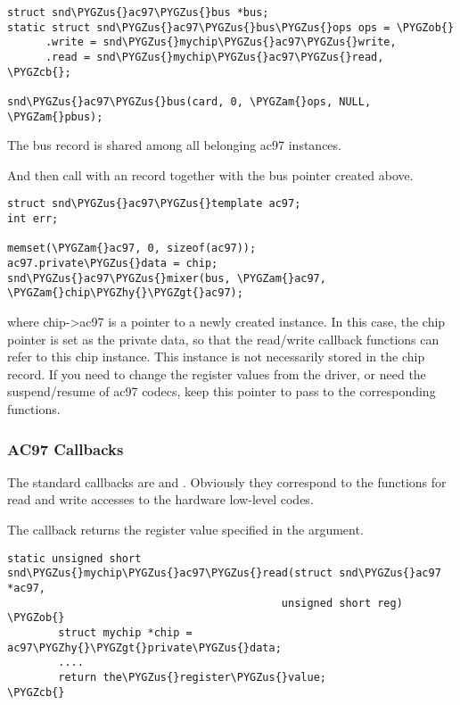 \documentclass[a4paper,8pt,english]{sphinxmanual}
\def\PYGZus{\char`\_}
\def\PYGZob{\char`\{}
\def\PYGZcb{\char`\}}
\def\PYGZam{\char`\&}
\def\PYGZgt{\char`\>}
\def\PYGZhy{\char`\-}
\begin{document}
\begin{Verbatim}[commandchars=\\\{\}]
struct snd\PYGZus{}ac97\PYGZus{}bus *bus;
static struct snd\PYGZus{}ac97\PYGZus{}bus\PYGZus{}ops ops = \PYGZob{}
      .write = snd\PYGZus{}mychip\PYGZus{}ac97\PYGZus{}write,
      .read = snd\PYGZus{}mychip\PYGZus{}ac97\PYGZus{}read,
\PYGZcb{};

snd\PYGZus{}ac97\PYGZus{}bus(card, 0, \PYGZam{}ops, NULL, \PYGZam{}pbus);
\end{Verbatim}

The bus record is shared among all belonging ac97 instances.

And then call {\hyperref[sound/kernel\string-api/alsa\string-driver\string-api:c.snd_ac97_mixer]{\emph{}}} with an  record together with
the bus pointer created above.

\begin{Verbatim}[commandchars=\\\{\}]
struct snd\PYGZus{}ac97\PYGZus{}template ac97;
int err;

memset(\PYGZam{}ac97, 0, sizeof(ac97));
ac97.private\PYGZus{}data = chip;
snd\PYGZus{}ac97\PYGZus{}mixer(bus, \PYGZam{}ac97, \PYGZam{}chip\PYGZhy{}\PYGZgt{}ac97);
\end{Verbatim}

where chip-\textgreater{}ac97 is a pointer to a newly created 
instance. In this case, the chip pointer is set as the private data,
so that the read/write callback functions can refer to this chip
instance. This instance is not necessarily stored in the chip
record. If you need to change the register values from the driver, or
need the suspend/resume of ac97 codecs, keep this pointer to pass to
the corresponding functions.


\subsubsection{AC97 Callbacks}
\label{sound/kernel-api/writing-an-alsa-driver:ac97-callbacks}
The standard callbacks are  and . Obviously they
correspond to the functions for read and write accesses to the
hardware low-level codes.

The  callback returns the register value specified in the
argument.

\begin{Verbatim}[commandchars=\\\{\}]
static unsigned short snd\PYGZus{}mychip\PYGZus{}ac97\PYGZus{}read(struct snd\PYGZus{}ac97 *ac97,
                                           unsigned short reg)
\PYGZob{}
        struct mychip *chip = ac97\PYGZhy{}\PYGZgt{}private\PYGZus{}data;
        ....
        return the\PYGZus{}register\PYGZus{}value;
\PYGZcb{}
\end{Verbatim}
\end{document}
